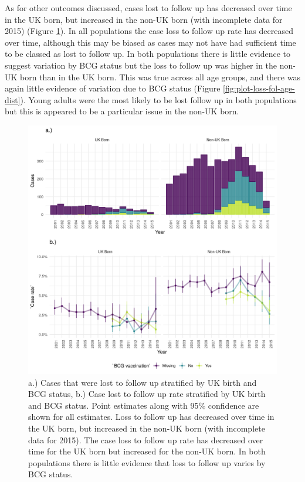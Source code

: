 \documentclass[11pt,twoside]{bristolthesis}
\begin{document}
  As for other outcomes discussed, cases lost to follow up has decreased over time in the UK born, but increased in the non-UK born (with incomplete data for 2015) (Figure \ref{fig:plot-loss-fol-case-rate}). In all populations the case loss to follow up rate has decreased over time, although this may be biased as cases may not have had sufficient time to be classed as lost to follow up. In both populations there is little evidence to suggest variation by BCG status but the loss to follow up was higher in the non-UK born than in the UK born. This was true across all age groups, and there was again little evidence of variation due to BCG status (Figure \ref{fig:plot-loss-fol-age-dist}). Young adults were the most likely to be lost follow up in both populations but this is appeared to be a particular issue in the non-UK born.
  \begin{figure}
  
  {\centering \includegraphics[width=0.8\linewidth,]{chapters/tb-epi-england/figures/plot-loss-fol-case-rate} 
  
  }
  
  \caption[.) Cases that were lost to follow up stratified by UK birth and BCG status, b.) Case lost to follow up rate stratified by UK birth and BCG status.]{a.) Cases that were lost to follow up stratified by UK birth and BCG status, b.) Case lost to follow up rate stratified by UK birth and BCG status. Point estimates along with 95\% confidence are shown for all estimates. Loss to follow up has decreased over time in the UK born, but increased in the non-UK born (with incomplete data for 2015). The case loss to follow up rate has decreased over time for the UK born but increased for the non-UK born. In both populations there is little evidence that loss to follow up varies by BCG status.}\label{fig:plot-loss-fol-case-rate}
  \end{figure}
\end{document}
